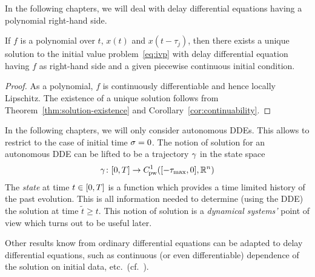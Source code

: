 
    In the following chapters, we will deal with delay differential equations having a polynomial right-hand side.
    \begin{corollary}
        If $f$ is a polynomial over $t$, $x(t)$ and $x(t-\tau_j)$, then there exists a unique solution to the initial value problem~\eqref{eq:ivp} with delay differential equation having $f$ as right-hand side and a given piecewise continuous initial condition.
    \end{corollary}
    \begin{proof}
        As a polynomial, $f$ is continuously differentiable and hence locally Lipschitz. The existence of a unique solution follows from Theorem~\ref{thm:solution-existence} and Corollary~\ref{cor:continuability}.
    \end{proof}

    In the following chapters, we will only consider autonomous DDEs. This allows to restrict to the case of initial time $\sigma=0$.
    The notion of solution for an autonomous DDE can be lifted to be a trajectory $\gamma$ in the state space
    \begin{equation}
        \trajectory \from \compactum{0}{T} \to \statespace[-\taumax]
    \end{equation}
    The \emph{state} at time $t\in[0,T]$ is a function which provides a time limited history of the past evolution. This is all information needed to determine (using the DDE) the solution at time $\tilde{t}\geq t$.
    This notion of solution is a \emph{dynamical systems'} point of view which turns out to be useful later.

    Other results know from ordinary differential equations can be adapted to delay differential equations, such as continuous (or even differentiable) dependence of the solution on initial data, etc.\ (cf.~\cite{Dads06DDEs}).
    
